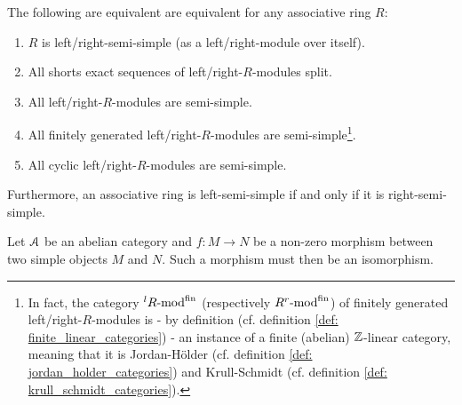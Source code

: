             \begin{example} \label{example: modules_over_semi_simple_rings}
                \cite[Theorem 2.5]{lam_first_course_in_noncommutative_rings} The following are equivalent are equivalent for any associative ring $R$:
                    \noindent
                    \begin{enumerate}
                        \item $R$ is left/right-semi-simple (as a left/right-module over itself).
                        \item All shorts exact sequences of left/right-$R$-modules split.
                        \item All left/right-$R$-modules are semi-simple.
                        \item All finitely generated left/right-$R$-modules are semi-simple\footnote{In fact, the category ${}^lR\text{-}\mathrm{mod}^{\mathrm{fin}}$ (respectively $R^r\text{-}\mathrm{mod}^{\mathrm{fin}}$) of finitely generated left/right-$R$-modules is - by definition (cf. definition \ref{def: finite_linear_categories}) - an instance of a finite (abelian) $\mathbb{Z}$-linear category, meaning that it is Jordan-H\"older (cf. definition \ref{def: jordan_holder_categories}) and Krull-Schmidt (cf. definition \ref{def: krull_schmidt_categories}).}. 
                        \item All cyclic left/right-$R$-modules are semi-simple. 
                    \end{enumerate}
                Furthermore, an associative ring is left-semi-simple if and only if it is right-semi-simple.  
            \end{example}
            \begin{lemma} \label{lemma: schur_lemma_for_abelian_categories}
                Let $\mathcal{A}$ be an abelian category and $f: M \to N$ be a non-zero morphism between two simple objects $M$ and $N$. Such a morphism must then be an isomorphism.
            \end{lemma}
